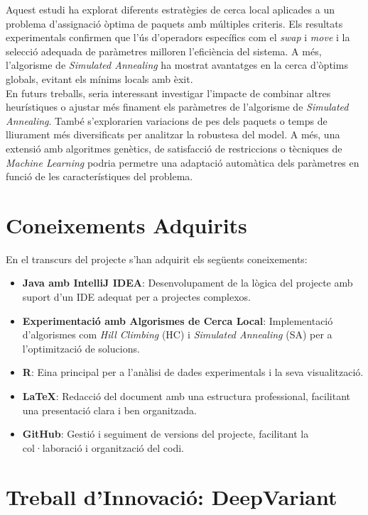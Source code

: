 \documentclass[a4paper]{article}
\begin{document}
\begin{table}[ht]
	Aquest estudi ha explorat diferents estratègies de cerca local aplicades a un problema d'assignació òptima de paquets amb múltiples criteris. Els resultats experimentals confirmen que l'ús d'operadors específics com el \textit{swap} i \textit{move} i la selecció adequada de paràmetres milloren l'eficiència del sistema. A més, l'algorisme de \textit{Simulated Annealing} ha mostrat avantatges en la cerca d'òptims globals, evitant els mínims locals amb èxit. \\
	
	En futurs treballs, seria interessant investigar l'impacte de combinar altres heurístiques o ajustar més finament els paràmetres de l'algorisme de \textit{Simulated Annealing}. També s'explorarien variacions de pes dels paquets o temps de lliurament més diversificats per analitzar la robustesa del model. A més, una extensió amb algoritmes genètics, de satisfacció de restriccions o tècniques de \textit{Machine Learning} podria permetre una adaptació automàtica dels paràmetres en funció de les característiques del problema.
	
	\section{Coneixements Adquirits}
	En el transcurs del projecte s'han adquirit els següents coneixements:
	

	\begin{itemize}
		\item \textbf{Java amb IntelliJ IDEA}: Desenvolupament de la lògica del projecte amb suport d'un IDE adequat per a projectes complexos.
		\item \textbf{Experimentació amb Algorismes de Cerca Local}: Implementació d'algorismes com \textit{Hill Climbing} (HC) i \textit{Simulated Annealing} (SA) per a l'optimització de solucions.
		\item \textbf{R}: Eina principal per a l'anàlisi de dades experimentals i la seva visualització.
		\item \textbf{\LaTeX}: Redacció del document amb una estructura professional, facilitant una presentació clara i ben organitzada.
		\item \textbf{GitHub}: Gestió i seguiment de versions del projecte, facilitant la col·laboració i organització del codi.
	\end{itemize}

	
	
	\newpage
	\section{Treball d'Innovació: DeepVariant}
	

\end{table}
\end{document}
